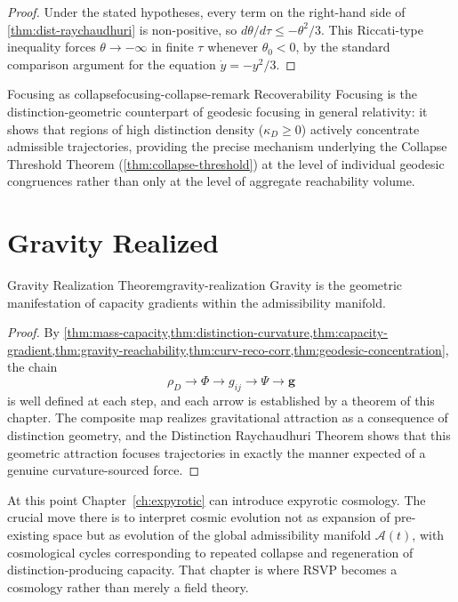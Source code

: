 \documentclass[12pt,twoside,openright]{book}
\begin{document}
\begin{proof}
  Under the stated hypotheses, every term on the right-hand
  side of \cref{thm:dist-raychaudhuri} is non-positive, so
  $d\theta/d\tau \le -\theta^2/3$. This Riccati-type
  inequality forces $\theta \to -\infty$ in finite $\tau$
  whenever $\theta_0 < 0$, by the standard comparison
  argument for the equation $\dot y = -y^2/3$.
\end{proof}

\begin{remark}{Focusing as collapse}{focusing-collapse-remark}
  Recoverability Focusing is the distinction-geometric
  counterpart of geodesic focusing in general relativity: it
  shows that regions of high distinction density
  ($\kappa_D \ge 0$) actively concentrate admissible
  trajectories, providing the precise mechanism underlying
  the Collapse Threshold Theorem
  (\cref{thm:collapse-threshold}) at the level of individual
  geodesic congruences rather than only at the level of
  aggregate reachability volume.
\end{remark}

\section{Gravity Realized}
\label{sec:ch17-realization}

\begin{theorem}{Gravity Realization Theorem}{gravity-realization}
  Gravity is the geometric manifestation of capacity
  gradients within the admissibility manifold.
\end{theorem}

\begin{proof}
  By \cref{thm:mass-capacity,thm:distinction-curvature,thm:capacity-gradient,thm:gravity-reachability,thm:curv-reco-corr,thm:geodesic-concentration},
  the chain
  \[
    \rho_D \to \Phi \to g_{ij} \to \Psi \to \mathbf{g}
  \]
  is well defined at each step, and each arrow is
  established by a theorem of this chapter. The composite
  map realizes gravitational attraction as a consequence
  of distinction geometry, and the Distinction Raychaudhuri
  Theorem shows that this geometric attraction focuses
  trajectories in exactly the manner expected of a genuine
  curvature-sourced force.
\end{proof}

At this point Chapter~\ref{ch:expyrotic} can introduce
expyrotic cosmology. The crucial move there is to
interpret cosmic evolution not as expansion of pre-existing
space but as evolution of the global admissibility
manifold $\mathcal{A}(t)$, with cosmological cycles
corresponding to repeated collapse and regeneration of
distinction-producing capacity. That chapter is where RSVP
becomes a cosmology rather than merely a field theory.
\end{document}
